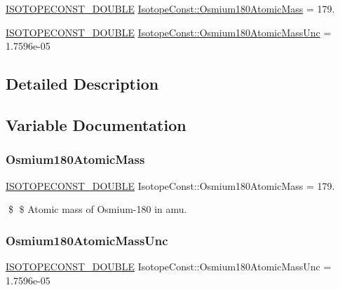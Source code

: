 \begin{DoxyCompactItemize}
\item 
\mbox{\hyperlink{group___isotope_const-_macros_ga8f45a7272ce02c0b4c65c44636ed719a}{I\+S\+O\+T\+O\+P\+E\+C\+O\+N\+S\+T\+\_\+\+D\+O\+U\+B\+LE}} \mbox{\hyperlink{group___isotope_const-_osmium-_os180_ga6df609bf0dbfe48c9b6efc0937329700}{Isotope\+Const\+::\+Osmium180\+Atomic\+Mass}} = 179.
\item 
\mbox{\hyperlink{group___isotope_const-_macros_ga8f45a7272ce02c0b4c65c44636ed719a}{I\+S\+O\+T\+O\+P\+E\+C\+O\+N\+S\+T\+\_\+\+D\+O\+U\+B\+LE}} \mbox{\hyperlink{group___isotope_const-_osmium-_os180_ga38d1e366b6141a4d5e4a4ca7ec173e12}{Isotope\+Const\+::\+Osmium180\+Atomic\+Mass\+Unc}} = 1.\+7596e-\/05
\end{DoxyCompactItemize}


\subsection{Detailed Description}


\subsection{Variable Documentation}
\mbox{\label{group___isotope_const-_osmium-_os180_ga6df609bf0dbfe48c9b6efc0937329700}} 
\subsubsection{\texorpdfstring{Osmium180\+Atomic\+Mass}{Osmium180AtomicMass}}
{\footnotesize\ttfamily \mbox{\hyperlink{group___isotope_const-_macros_ga8f45a7272ce02c0b4c65c44636ed719a}{I\+S\+O\+T\+O\+P\+E\+C\+O\+N\+S\+T\+\_\+\+D\+O\+U\+B\+LE}} Isotope\+Const\+::\+Osmium180\+Atomic\+Mass = 179.}

\$ \$ Atomic mass of Osmium-\/180 in amu. \mbox{\label{group___isotope_const-_osmium-_os180_ga38d1e366b6141a4d5e4a4ca7ec173e12}} 
\subsubsection{\texorpdfstring{Osmium180\+Atomic\+Mass\+Unc}{Osmium180AtomicMassUnc}}
{\footnotesize\ttfamily \mbox{\hyperlink{group___isotope_const-_macros_ga8f45a7272ce02c0b4c65c44636ed719a}{I\+S\+O\+T\+O\+P\+E\+C\+O\+N\+S\+T\+\_\+\+D\+O\+U\+B\+LE}} Isotope\+Const\+::\+Osmium180\+Atomic\+Mass\+Unc = 1.\+7596e-\/05}

